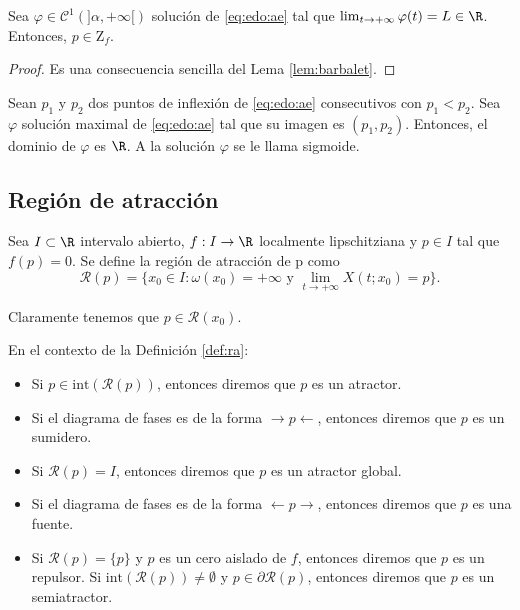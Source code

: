 \documentclass{article}
\begin{document}
\begin{prop}
  Sea $\varphi \in \mathcal{C}^1(]\alpha, +\infty[)$ solución de \eqref{eq:edo:ae} tal que
  $\lim_{t \to +\infty} \varphi(t) = L \in \R$. Entonces, $p \in \mathrm{Z}_f$.
\end{prop}
\begin{proof}
  Es una consecuencia sencilla del Lema \ref{lem:barbalet}.
\end{proof}

\begin{cor}
  Sean $p_1$ y $p_2$ dos puntos de inflexión de \eqref{eq:edo:ae} consecutivos con $p_1 < p_2$. Sea
  $\varphi$ solución maximal de \eqref{eq:edo:ae} tal que su imagen es $(p_1, p_2)$. Entonces, el
  dominio de $\varphi$ es $\R$. A la solución $\varphi$ se le llama sigmoide.
\end{cor}

\begin{definition} 
\end{definition}

\subsection{Región de atracción}

\begin{definition}
  \label{def:ra}
  Sea $I \subset \R$ intervalo abierto, $f: I \to \R$ localmente lipschitziana y $p \in I$ tal que
  $f(p) = 0$. Se define la región de atracción de p como
  \[ \mathcal{R}(p) = \{x_0\in I: \omega(x_0) = +\infty \text{ y } \lim_{t \to +\infty} X(t;x_0) =
    p\}. \]
\end{definition}

Claramente tenemos que $p \in \mathcal{R}(x_0)$.

\begin{definition}
  \label{def:atractor}
  En el contexto de la Definición \ref{def:ra}:
  \begin{itemize}
  \item Si $p \in \mathrm{int}(\mathcal{R}(p))$, entonces diremos que $p$ es un atractor.
  \item Si el diagrama de fases es de la forma $\rightarrow p \leftarrow$, entonces diremos que $p$
    es un sumidero.
  \item Si $\mathcal{R}(p) = I$, entonces diremos que $p$ es un atractor global.
  \item Si el diagrama de fases es de la forma $\leftarrow p \rightarrow$, entonces diremos que $p$
    es una fuente.
  \item Si $\mathcal{R}(p) = \{p\}$ y $p$ es un cero aislado de $f$, entonces diremos que $p$ es un
    repulsor.  Si $\mathrm{int}(\mathcal{R}(p)) \ne \emptyset$ y $p \in \partial \mathcal{R}(p)$,
    entonces diremos que $p$ es un semiatractor.
  \end{itemize}
\end{definition}
\end{document}
